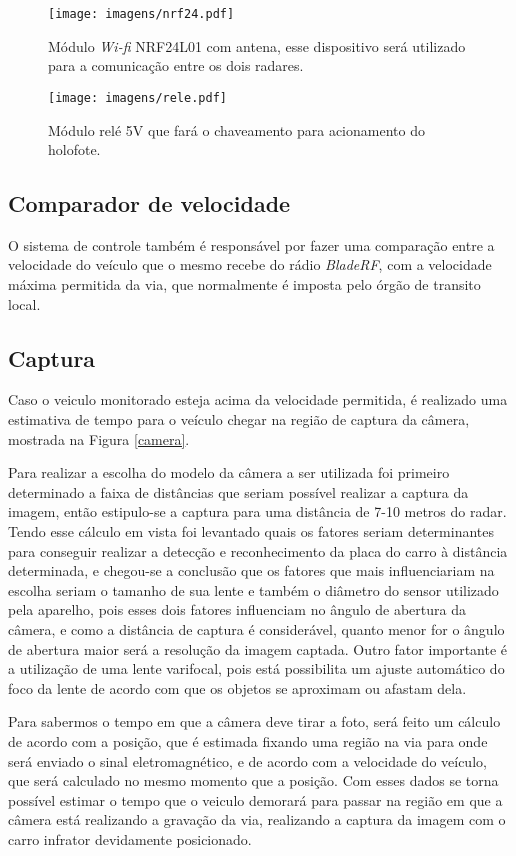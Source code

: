     \begin{figure}[H]
    \centering
    \texttt{[image: imagens/nrf24.pdf]}
    \caption{Módulo \emph{Wi-fi} NRF24L01 com antena, esse dispositivo será utilizado para a comunicação entre os dois radares.}
    \label{nrf24}
\end{figure}

    \begin{figure}[H]
    \centering
    \texttt{[image: imagens/rele.pdf]}
    \caption{Módulo relé 5V que fará o chaveamento para acionamento do holofote.}
    \label{rele}
\end{figure}

    \subsection{Comparador de velocidade}
    O sistema de controle também é responsável por fazer uma comparação entre a velocidade do veículo que o mesmo recebe do rádio \emph{BladeRF}, com a velocidade máxima permitida da via, que normalmente é imposta pelo órgão de transito local.

    \subsection{Captura}
    Caso o veiculo monitorado esteja acima da velocidade permitida, é realizado uma estimativa de tempo para o veículo chegar na região de captura da câmera, mostrada na Figura \ref{camera}.
    
    Para realizar a escolha do modelo da câmera a ser utilizada foi primeiro determinado a faixa de distâncias que seriam possível realizar a captura da imagem, então estipulo-se a captura para uma distância de 7-10 metros do radar. Tendo esse cálculo em vista foi levantado quais os fatores seriam determinantes para conseguir realizar a detecção e reconhecimento da placa do carro à distância determinada, e chegou-se a conclusão que os fatores que mais influenciariam na escolha seriam o tamanho de sua lente e também o diâmetro do sensor utilizado pela aparelho, pois esses dois fatores influenciam no ângulo de abertura da câmera, e como a distância de captura é considerável, quanto menor for o ângulo de abertura maior será a resolução da imagem captada. Outro fator importante é a utilização de uma lente varifocal, pois está possibilita um ajuste automático do foco da lente de acordo com que os objetos se aproximam ou afastam dela. 
    
    
    Para sabermos o tempo em que a câmera deve tirar a foto, será feito um cálculo de acordo com a posição, que é estimada fixando uma região na via para onde será enviado o sinal eletromagnético, e de acordo com a velocidade do veículo, que  será calculado no mesmo momento que a posição. Com esses dados se torna possível estimar o tempo que o veiculo demorará para passar na região em que a câmera está realizando a gravação da via, realizando a captura da imagem com o carro infrator devidamente posicionado.
    
